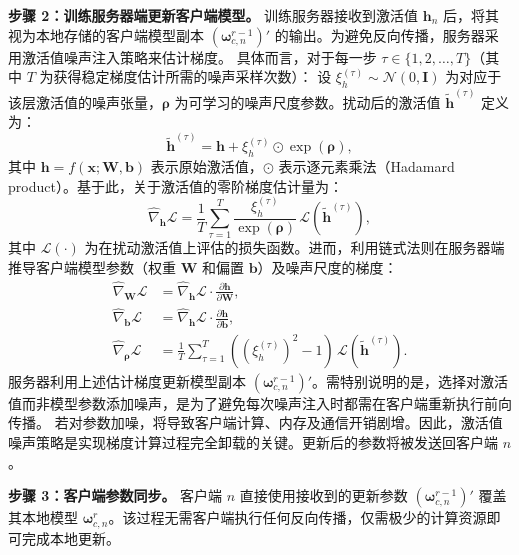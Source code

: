 \textbf{步骤 2：训练服务器端更新客户端模型。}
训练服务器接收到激活值 $\mathbf{h}_n$ 后，将其视为本地存储的客户端模型副本 $(\boldsymbol{\omega}_{c,n}^{r-1})'$ 的输出。为避免反向传播，服务器采用激活值噪声注入策略来估计梯度。
具体而言，对于每一步 $\tau \in \{1, 2, \dots, T\}$（其中 $T$ 为获得稳定梯度估计所需的噪声采样次数）：
设 $\xi_h^{(\tau)} \sim \mathcal{N}(0, \mathbf{I})$ 为对应于该层激活值的噪声张量，$\boldsymbol{\rho}$ 为可学习的噪声尺度参数。扰动后的激活值 $\tilde{\mathbf{h}}^{(\tau)}$ 定义为：
\begin{equation}
\label{eq:act_noise}
\tilde{\mathbf{h}}^{(\tau)} = \mathbf{h} + \xi_h^{(\tau)} \odot \exp(\boldsymbol{\rho}),
\end{equation}
其中 $\mathbf{h} = f(\mathbf{x}; \mathbf{W}, \mathbf{b})$ 表示原始激活值，$\odot$ 表示逐元素乘法（Hadamard product）。基于此，关于激活值的零阶梯度估计量为：
\begin{equation}
\label{eq:grad_h}
\hat{\nabla}_{\mathbf{h}} \mathcal{L} = \frac{1}{T} \sum_{\tau=1}^{T} \frac{\xi_h^{(\tau)}}{\exp(\boldsymbol{\rho})} \, \mathcal{L}(\tilde{\mathbf{h}}^{(\tau)}),
\end{equation}
其中 $\mathcal{L}(\cdot)$ 为在扰动激活值上评估的损失函数。进而，利用链式法则在服务器端推导客户端模型参数（权重 $\mathbf{W}$ 和偏置 $\mathbf{b}$）及噪声尺度的梯度：
\begin{align}
\label{eq:grad_w_chain}
\hat{\nabla}_{\mathbf{W}} \mathcal{L} &= \hat{\nabla}_{\mathbf{h}} \mathcal{L} \cdot \frac{\partial \mathbf{h}}{\partial \mathbf{W}}, \\
\label{eq:grad_b_chain}
\hat{\nabla}_{\mathbf{b}} \mathcal{L} &= \hat{\nabla}_{\mathbf{h}} \mathcal{L} \cdot \frac{\partial \mathbf{h}}{\partial \mathbf{b}},\\
\label{eq:grad_sigma_act}
\hat{\nabla}_{\boldsymbol{\rho}} \mathcal{L} &= \frac{1}{T} \sum_{\tau=1}^{T} \left((\xi_h^{(\tau)})^2 - 1\right) \, \mathcal{L}(\tilde{\mathbf{h}}^{(\tau)}).
\end{align}
服务器利用上述估计梯度更新模型副本 $(\boldsymbol{\omega}_{c,n}^{r-1})'$。需特别说明的是，选择对激活值而非模型参数添加噪声，是为了避免每次噪声注入时都需在客户端重新执行前向传播。
若对参数加噪，将导致客户端计算、内存及通信开销剧增。因此，激活值噪声策略是实现梯度计算过程完全卸载的关键。更新后的参数将被发送回客户端 $n$。

\textbf{步骤 3：客户端参数同步。}
客户端 $n$ 直接使用接收到的更新参数 $(\boldsymbol{\omega}_{c,n}^{r-1})'$ 覆盖其本地模型 $\boldsymbol{\omega}_{c,n}^r$。该过程无需客户端执行任何反向传播，仅需极少的计算资源即可完成本地更新。

